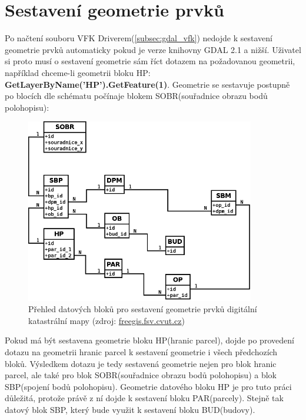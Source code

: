 \section{Sestavení geometrie prvků}
\label{sec:sestaveni_geometrie}
Po načtení  souboru VFK Driverem(\ref{subsec:gdal_vfk}) nedojde k sestavení geometrie prvků automaticky pokud je verze knihovny GDAL 2.1 a nižší. Uživatel si proto musí o sestavení geometrie sám říct dotazem na požadovanou geometrii, například chceme-li geometrii bloku HP: \textbf{GetLayerByName('HP').GetFeature(1)}. Geometrie se sestavuje postupně po blocích dle schématu počínaje blokem SOBR(souřadnice obrazu bodů polohopisu):
\begin{figure}[H]
	 \centering
      \includegraphics[width=10cm]{./pictures/Vfk-diagram-geom.png}
      \caption{Přehled datových bloků pro sestavení geometrie prvků digitální katastrální mapy (zdroj:
      \href{http://freegis.fsv.cvut.cz/wiki/images/thumb/8/8a/Vfk-diagram-geom.png/744px-Vfk-diagram-geom.png}{freegis.fsv.cvut.cz})}
      \label{fig:vfk_diagram_geom}
  \end{figure}
Pokud má být sestavena geometrie bloku HP(hranic parcel), dojde po provedení dotazu na geometrii hranic parcel k sestavení geometrie i všech předchozích bloků. Výsledkem dotazu je tedy sestavená geometrie nejen pro blok hranic parcel, ale také pro blok SOBR(souřadnice obrazu bodů polohopisu) a blok SBP(spojení bodů polohopisu). Geometrie datového bloku HP je pro tuto práci důležitá, protože právě z ní dojde k sestavení bloku PAR(parcely). Stejně tak datový blok SBP, který bude využit k sestavení bloku BUD(budovy).
